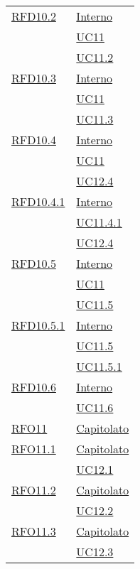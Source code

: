 \begin{longtable}{|>{\centering}m{5cm}|m{5cm}<{\centering}|}
\hyperlink{RFD10.2}{RFD10.2} & \hyperlink{Interno}{Interno}\\
& \hyperref[UC11]{UC11}\\
& \hyperref[UC11.2]{UC11.2}\\ \hline

\hyperlink{RFD10.3}{RFD10.3} & \hyperlink{Interno}{Interno}\\
& \hyperref[UC11]{UC11}\\
& \hyperref[UC11.3]{UC11.3}\\ \hline

\hyperlink{RFD10.4}{RFD10.4} & \hyperlink{Interno}{Interno}\\
& \hyperref[UC11]{UC11}\\
& \hyperref[UC12.4]{UC12.4}\\ \hline

\hyperlink{RFD10.4.1}{RFD10.4.1} & \hyperlink{Interno}{Interno}\\
& \hyperref[UC11.4.1]{UC11.4.1}\\
& \hyperref[UC12.4]{UC12.4}\\ \hline

\hyperlink{RFD10.5}{RFD10.5} & \hyperlink{Interno}{Interno}\\
& \hyperref[UC11]{UC11}\\
& \hyperref[UC11.5]{UC11.5}\\ \hline

\hyperlink{RFD10.5.1}{RFD10.5.1} & \hyperlink{Interno}{Interno}\\
& \hyperref[UC11.5]{UC11.5}\\
& \hyperref[UC11.5.1]{UC11.5.1}\\ \hline

\hyperlink{RFD10.6}{RFD10.6} & \hyperlink{Interno}{Interno}\\
& \hyperref[UC11.6]{UC11.6}\\ \hline

\hyperlink{RFO11}{RFO11} & \hyperlink{Capitolato}{Capitolato}\\ \hline

\hyperlink{RFO11.1}{RFO11.1} & \hyperlink{Capitolato}{Capitolato}\\
& \hyperref[UC12.1]{UC12.1}\\ \hline

\hyperlink{RFO11.2}{RFO11.2} & \hyperlink{Capitolato}{Capitolato}\\
& \hyperref[UC12.2]{UC12.2}\\ \hline

\hyperlink{RFO11.3}{RFO11.3} & \hyperlink{Capitolato}{Capitolato}\\
& \hyperref[UC12.3]{UC12.3}\\ \hline


\end{longtable}

